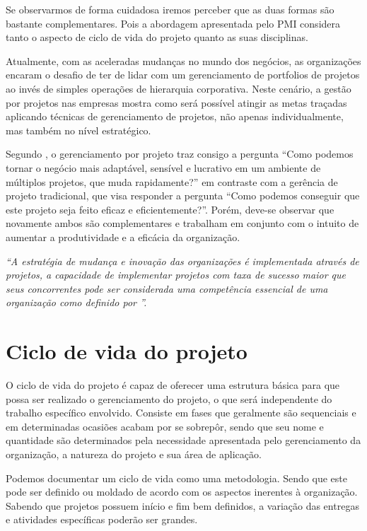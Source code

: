 \documentclass[12pt,a4paper,ruledheader,tocpage=prefix,floatnumber=continuous,pagestart=folhaderosto,font=times]{abnt}
\begin{document}
Se observarmos de forma cuidadosa iremos perceber que as duas formas são bastante complementares. Pois a abordagem apresentada pelo PMI considera tanto
o aspecto de ciclo de vida do projeto quanto as suas disciplinas.

Atualmente, com as aceleradas mudanças no mundo dos negócios, as organizações encaram o desafio de ter de lidar com um gerenciamento de portfolios de projetos
ao invés de simples operações de hierarquia corporativa. Neste cenário, a gestão por projetos nas empresas mostra como será possível atingir as metas traçadas
aplicando técnicas de gerenciamento de projetos, não apenas individualmente, mas também no nível estratégico.

Segundo , o gerenciamento por projeto traz consigo a pergunta ``Como podemos tornar o negócio mais adaptável, sensível e lucrativo
em um ambiente de múltiplos projetos, que muda rapidamente?'' em contraste com a gerência de projeto tradicional, que visa responder a pergunta ``Como
podemos conseguir que este projeto seja feito eficaz e eficientemente?''. Porém, deve-se observar que novamente ambos são complementares e trabalham em
conjunto com o intuito de aumentar a produtividade e a eficácia da organização.

\begin{flushright}
\hfill \textit{“A estratégia de mudança e inovação das organizações é implementada 
através de projetos, a capacidade de implementar projetos com taxa de 
sucesso maior que seus concorrentes pode ser considerada uma 
competência essencial de uma organização como definido por ”. }
\end{flushright}

\section{Ciclo de vida do projeto}
O ciclo de vida do projeto é capaz de oferecer uma estrutura básica para que possa ser realizado o gerenciamento do projeto, o que será independente do trabalho
específico envolvido. Consiste em fases que geralmente são sequenciais e em determinadas ocasiões acabam por se sobrepôr, sendo que seu nome e quantidade 
são determinados pela necessidade apresentada pelo gerenciamento da organização, a natureza do projeto e sua área de aplicação\cite{PMBOK2008}.

Podemos documentar um ciclo de vida como uma metodologia. Sendo que este pode ser definido ou moldado de acordo com os aspectos inerentes à organização.
Sabendo que projetos possuem início e fim bem definidos, a variação das entregas e atividades específicas poderão ser grandes.
\end{document}
